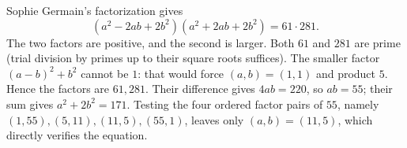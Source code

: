 Sophie Germain's factorization gives
\[
(a^2-2ab+2b^2)(a^2+2ab+2b^2)=61\cdot281.
\]
The two factors are positive, and the second is larger. Both $61$ and $281$ are prime (trial division by primes up to their square roots suffices). The smaller factor $(a-b)^2+b^2$ cannot be $1$: that would force $(a,b)=(1,1)$ and product $5$. Hence the factors are $61,281$. Their difference gives $4ab=220$, so $ab=55$; their sum gives $a^2+2b^2=171$.
Testing the four ordered factor pairs of $55$, namely $(1,55),(5,11),(11,5),(55,1)$, leaves only $\boxed{(a,b)=(11,5)}$, which directly verifies the equation.
